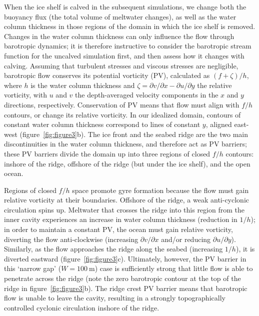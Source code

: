 \documentclass[draft]{agujournal2019}
\begin{document}
When the ice shelf is calved in the subsequent simulations, we change both the buoyancy flux (the total volume of meltwater changes), as well as the water column thickness in those regions of the domain in which the ice shelf is removed. Changes in the water column thickness can only influence the flow through barotropic dynamics; it is therefore instructive to consider the barotropic stream function for the uncalved simulation first, and then assess how it changes with calving. Assuming that turbulent stresses and viscous stresses are negligible, barotropic flow conserves its potential vorticity (PV),  calculated as $(f + \zeta)/h$, where $h$ is the water column thickness and $\zeta = \partial v / \partial x - \partial u / \partial y$ the relative vorticity, with $u$ and $v$ the depth-averaged velocity components in the $x$ and $y$ directions, respectively. Conservation of PV means that flow must align with $f/h$ contours, or change its relative vorticity. In our idealized domain, contours of constant water column thickness correspond to lines of constant $y$, aligned east-west (figure~\ref{fig:figure3}b). The ice front and the seabed ridge are the two main discontinuities in the water column thickness, and therefore act as PV barriers; these PV barriers divide the domain up into three regions of closed $f/h$ contours: inshore of the ridge, offshore of the ridge (but under the ice shelf), and the open ocean.

Regions of closed $f/h$ space promote gyre formation because the flow must gain relative vorticity at their boundaries. Offshore of the ridge, a weak anti-cyclonic circulation spins up. Meltwater that crosses the ridge into this region from the inner cavity experiences an increase in water column thickness (reduction in $1/h$); in order to maintain a constant PV, the ocean must gain relative vorticity, diverting the flow anti-clockwise (increasing $\partial v / \partial x$ and/or reducing $\partial u / \partial y$). Similarly, as the flow approaches the ridge along the seabed (increasing $1/h$), it is diverted eastward (figure~\ref{fig:figure3}c). Ultimately, however, the PV barrier in this `narrow gap' ($W=100~\text{m}$) case is sufficiently strong that little flow is able to penetrate across the ridge (note the zero barotropic contour at the top of the ridge in figure~\ref{fig:figure3}b). The ridge crest PV barrier means that barotropic flow is unable to leave the cavity, resulting in a strongly topographically controlled cyclonic circulation inshore of the ridge.
\end{document}
